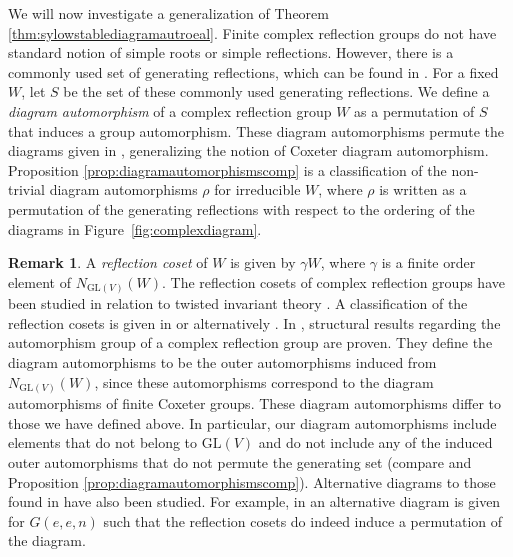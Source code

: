 \documentclass[12pt]{amsart}
\theoremstyle{plain}
\theoremstyle{definition}
\newtheorem{remark}[theorem]{Remark}
\numberwithin{equation}{section}
\numberwithin{equation}{section}
\begin{document}
	We will now investigate a generalization of Theorem \ref{thm:sylowstablediagramautroeal}. Finite complex reflection groups do not have standard notion of simple roots or simple reflections. However, there is a commonly used set of generating reflections, which can be found in \cite[App. 2, Tables 1-5]{Complexdiagrams}. For a fixed $W$, let $S$ be the set of these commonly used generating reflections. We define a \emph{diagram automorphism} of a complex reflection group $W$ as a permutation of $S$ that induces a group automorphism. These diagram automorphisms permute the diagrams given in \cite[App. 2, Tables 1-5]{Complexdiagrams}, generalizing the notion of Coxeter diagram automorphism. Proposition \ref{prop:diagramautomorphismscomp} is a classification of the non-trivial diagram automorphisms $\rho$ for irreducible $W$, where $\rho$ is written as a permutation of the generating reflections with respect to the ordering of the diagrams in Figure~\ref{fig:complexdiagram}.
	
	\begin{remark}
		A \emph{reflection coset} of $W$ is given by $\gamma W$, where $\gamma$ is a finite order element of $N_{\text{GL}(V)}(W)$. The reflection cosets of complex reflection groups have been studied in relation to twisted invariant theory \cite{twistedinvarianttheory,reflectionsubquotients}. A classification of the reflection cosets is given in \cite[3E]{SPETS1} or alternatively \cite[Table D.5]{GUSTAY}. In \cite{autocompref}, structural results regarding the automorphism group of a complex reflection group are proven. They define the diagram automorphisms to be the outer automorphisms induced from $N_{\text{GL}(V)}(W)$, since these automorphisms correspond to the diagram automorphisms of finite Coxeter groups. These diagram automorphisms differ to those we have defined above. In particular, our diagram automorphisms include elements that do not belong to $\text{GL}(V)$ and do not include any of the induced outer automorphisms that do not permute the generating set (compare \cite[3E]{SPETS1} and Proposition \ref{prop:diagramautomorphismscomp}). Alternative diagrams to those found in \cite[App. 2, Tables 1-5]{Complexdiagrams} have also been studied. For example, in \cite[2.2]{eer} an alternative diagram is given for $G(e,e,n)$ such that the  reflection cosets do indeed induce a permutation of the diagram.
	\end{remark}
	
\end{document}
